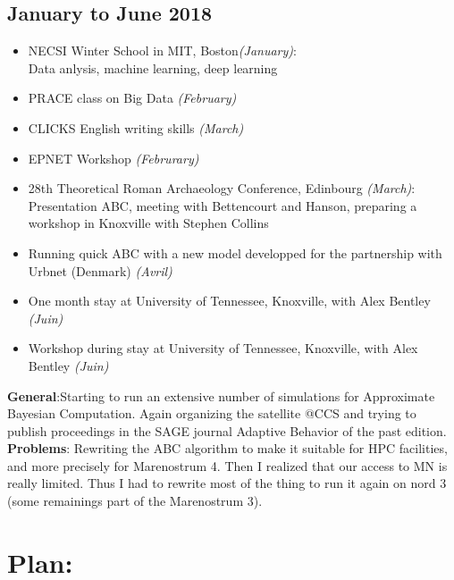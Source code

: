 \documentclass[a4paper]{article}
\begin{document}
\subsection*{January to June 2018}
	\begin{itemize}
	    \item NECSI Winter School in MIT, Boston\emph{(January)}:\\ \hspace{.2cm} Data anlysis, machine learning, deep learning 
	    \item PRACE class on Big Data \emph{(February)}
	    \item CLICKS English writing skills \emph{(March)}
	    \item EPNET Workshop \emph{(Februrary)}
	    \item 28th Theoretical Roman Archaeology Conference, Edinbourg \emph{(March)}:\\\hspace{.2cm}  Presentation ABC, meeting with Bettencourt and Hanson, preparing a workshop in Knoxville with Stephen Collins	    
        \item Running quick ABC with a new model developped for the partnership with Urbnet (Denmark) \emph{(Avril)}
        \item One month stay at University of Tennessee, Knoxville, with Alex Bentley \emph{(Juin)}
        \item Workshop during stay at University of Tennessee, Knoxville, with Alex Bentley \emph{(Juin)}
	\end{itemize}
	{\small
	\noindent   \textbf{General}:Starting to run an extensive number of simulations for Approximate Bayesian Computation. Again organizing the satellite @CCS and trying to publish proceedings in the SAGE journal Adaptive Behavior  of the past edition.\\
    \textbf{Problems}: Rewriting the ABC algorithm to make it suitable for HPC facilities, and more precisely for Marenostrum 4. Then I realized that our access to MN is really limited. Thus I had to rewrite most of the thing to run it again on nord 3 (some remainings part of the Marenostrum 3).
	}

	\section*{Plan:}
\end{document}
